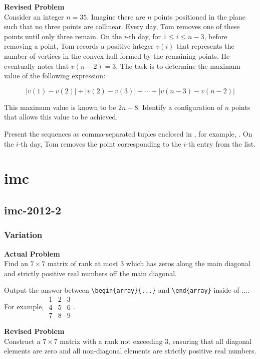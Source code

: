 \textbf{Revised Problem}\\
Consider an integer $n = 35$. Imagine there are $n$ points positioned in the plane such that no three points are collinear. Every day, Tom removes one of these points until only three remain. On the $i$-th day, for $1 \leqslant i \leqslant n - 3$, before removing a point, Tom records a positive integer $v(i)$ that represents the number of vertices in the convex hull formed by the remaining points. He eventually notes that $v(n-2)=3$. The task is to determine the maximum value of the following expression:

$$|v(1) - v(2)| + |v(2) - v(3)| + \cdots + |v(n-3) - v(n-2)|$$

This maximum value is known to be $2n-8$. Identify a configuration of $n$ points that allows this value to be achieved.

Present the sequences as comma-separated tuples enclosed in \boxed, for example, . On the $i$-th day, Tom removes the point corresponding to the $i$-th entry from the list.

\section{imc}
\subsection{imc-2012-2}
\subsubsection{Variation}
\textbf{Actual Problem}\\
Find an $7 \times 7$ matrix of rank at most 3 which has zeros along the main diagonal and strictly positive real numbers off the main diagonal.

Output the answer between \verb|\begin{array}{...}| and \verb|\end{array}| inside of $\boxed{...}$. For example, $\boxed{\begin{array}{ccc}1 & 2 & 3 \\ 4 & 5 & 6 \\ 7 & 8 & 9\end{array}}$.

\textbf{Revised Problem}\\
Construct a $7 \times 7$ matrix with a rank not exceeding 3, ensuring that all diagonal elements are zero and all non-diagonal elements are strictly positive real numbers.


